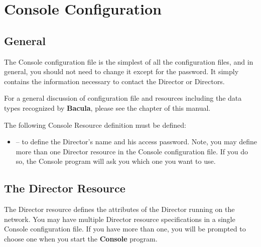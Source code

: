 
\section*{Console Configuration}
\label{_ChapterStart36}

\subsection*{General}

The Console configuration file is the simplest of all the configuration files,
and in general, you should not need to change it except for the password. It
simply contains the information necessary to contact the Director or
Directors. 

For a general discussion of configuration file and resources including the
data types recognized by {\bf Bacula}, please see the 
 chapter of this manual. 

The following Console Resource definition must be defined: 

\begin{itemize}
\item 
    -- to  define the
   Director's name and his access password. Note,  you may define more than one
Director resource in the  Console configuration file. If you do so, the
Console program  will ask you which one you want to use. 
\end{itemize}

\subsection*{The Director Resource}
\label{DirectorResource3}

The Director resource defines the attributes of the Director running on the
network. You may have multiple Director resource specifications in a single
Console configuration file. If you have more than one, you will be prompted to
choose one when you start the {\bf Console} program. 

